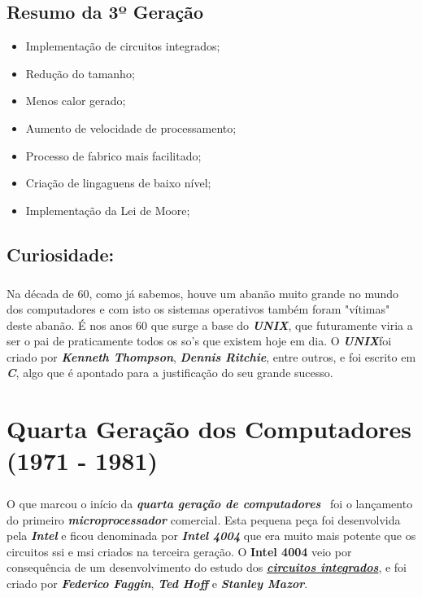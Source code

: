 \documentclass{report}
\begin{document}
\section{Resumo da 3º Geração }
\begin{itemize}
	\item Implementação de circuitos integrados;
	\item Redução do tamanho;
	\item Menos calor gerado;
	\item Aumento de velocidade de processamento;
	\item Processo de fabrico mais facilitado;
	\item Criação de lingaguens de baixo nível;
	\item Implementação da Lei de Moore;
\end{itemize}

\section{Curiosidade:}
\paragraph{}
Na década de 60, como já sabemos, houve um abanão muito grande no mundo dos computadores e com isto os sistemas operativos também foram "vítimas" deste abanão. 
É nos anos 60 que surge a base do  \textbf{\textit{UNIX}}, que futuramente viria a ser o pai de praticamente todos os \acs{so}'s que existem hoje em dia. O \textbf{\textit{UNIX}}foi criado por \textbf{\textit{Kenneth Thompson}}, \textbf{\textit{Dennis Ritchie}}, entre outros, e foi escrito em \textbf{\textit{C}}, algo que é apontado para a justificação do seu grande sucesso.

\newpage

\chapter{Quarta Geração dos Computadores (1971 - 1981)}
\label{chap.QG}
\paragraph{}
O que marcou o início da \textbf{\textit{quarta geração de computadores}}~\cite{quartageracao} foi o lançamento do primeiro \textbf{\textit{microprocessador}} comercial.\newline
 Esta pequena peça foi desenvolvida pela \textbf{\textit{Intel}} e ficou denominada por \textbf{\textit{Intel 4004}} que era muito mais potente que os circuitos \acs{ssi} e \acs{msi} criados na terceira geração. O \textbf{Intel 4004} veio por consequência de um desenvolvimento do estudo dos \hyperref[sec:circuitos]{\textbf{\textit{circuitos integrados}}}, e foi criado por \textbf{\textit{Federico Faggin}}, \textbf{\textit{Ted Hoff}} e \textbf{\textit{Stanley Mazor}}.
\end{document}
